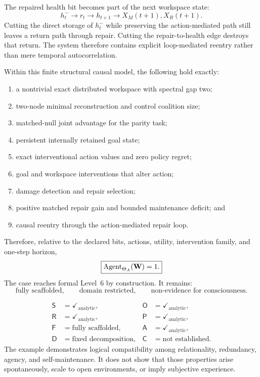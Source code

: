 
The repaired health bit becomes part of the next workspace state:
\[
h_t^-
\longrightarrow
r_t
\longrightarrow
h_{t+1}
\longrightarrow
X_M(t+1),X_R(t+1).
\]
Cutting the direct storage of \(h_t^-\) while preserving the action-mediated
path still leaves a return path through repair. Cutting the repair-to-health
edge destroys that return. The system therefore contains explicit
loop-mediated reentry rather than mere temporal autocorrelation.


Within this finite structural causal model, the following hold exactly:
\begin{enumerate}
\item a nontrivial exact distributed workspace with spectral gap two;
\item two-node minimal reconstruction and control coalition size;
\item matched-null joint advantage for the parity task;
\item persistent internally retained goal state;
\item exact interventional action values and zero policy regret;
\item goal and workspace interventions that alter action;
\item damage detection and repair selection;
\item positive matched repair gain and bounded maintenance deficit; and
\item causal reentry through the action-mediated repair loop.
\end{enumerate}
Therefore, relative to the declared bits, actions, utility, intervention family,
and one-step horizon,
\[
\boxed{
\operatorname{Agent}_{\Theta_A}(\mathbf W)=1.
}
\]
The case reaches formal Level~6 by construction. It remains:
\[
\text{fully scaffolded},
\qquad
\text{domain restricted},
\qquad
\text{non-evidence for consciousness}.
\]


\[
\boxed{
\begin{aligned}
\mathsf S&=\checkmark_{\mathrm{analytic}},
&\mathsf O&=\checkmark_{\mathrm{analytic}},\\
\mathsf R&=\checkmark_{\mathrm{analytic}},
&\mathsf P&=\checkmark_{\mathrm{analytic}},\\
\mathsf F&=\text{fully scaffolded},
&\mathsf A&=\checkmark_{\mathrm{analytic}},\\
\mathsf D&=\text{fixed decomposition},
&\mathsf C&=\text{not established}.
\end{aligned}
}
\]
The example demonstrates logical compatibility among relationality, redundancy,
agency, and self-maintenance. It does not show that those properties arise
spontaneously, scale to open environments, or imply subjective experience.

